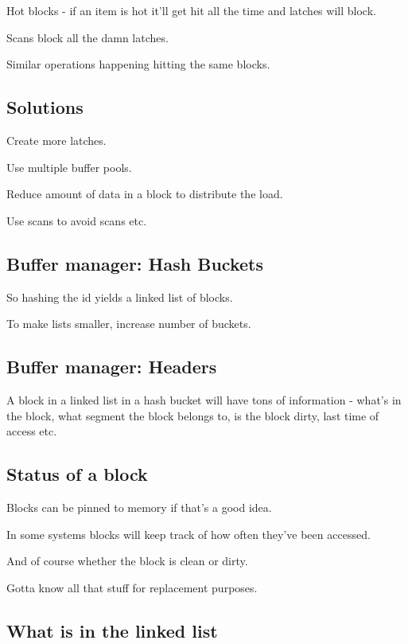 \documentclass{article}
\begin{document}
			Hot blocks - if an item is hot it'll get hit all the time and latches will block.
			
			Scans block all the damn latches.
			
			Similar operations happening hitting the same blocks.
			
		\subsection{Solutions}
		
			Create more latches.
			
			Use multiple buffer pools.
			
			Reduce amount of data in a block to distribute the load.
			
			Use scans to avoid scans etc.
			
		\subsection{Buffer manager: Hash Buckets}
		
			So hashing the id yields a linked list of blocks.
			
			To make lists smaller, increase number of buckets.
			
		\subsection{Buffer manager: Headers}
		
			A block in a linked list in a hash bucket will have tons of information - what's in the block, what segment the block belongs to, is the block dirty, last time of access etc.
			
		\subsection{Status of a block}
		
			Blocks can be pinned to memory if that's a good idea.
			
			In some systems blocks will keep track of how often they've been accessed.
			
			And of course whether the block is clean or dirty.
			
			Gotta know all that stuff for replacement purposes.
			
		\subsection{What is in the linked list}
		
\end{document}
